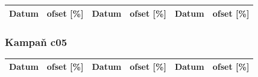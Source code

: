 \documentclass[a4paper,twoside,11pt]{article}
\begin{document}
\begin{tabular}{|l|l||l|l||l|l|}
\hline
Datum & ofset [\%] & Datum & ofset [\%] & Datum & ofset [\%]\\
\hline

\end{tabular}





\subsubsection{Kampaň c05}

\begin{tabular}{|l|l||l|l||l|l|}
\hline
Datum & ofset [\%] & Datum & ofset [\%] & Datum & ofset [\%]\\
\hline

\end{tabular}
\end{document}
